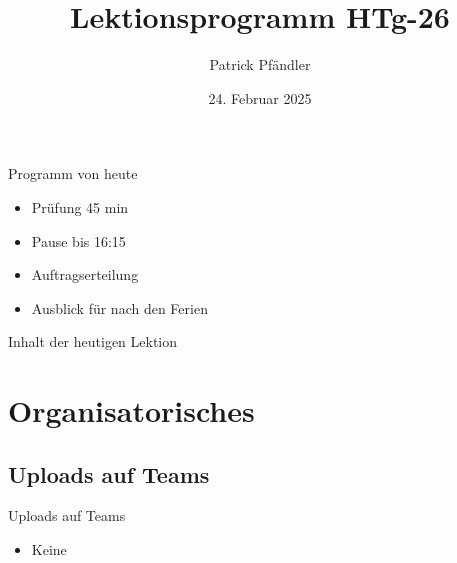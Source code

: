 



\title{\textbf{Lektionsprogramm HTg-26}}
\author{Patrick Pfändler}
\date{24. Februar   2025}




\frame{\titlepage}


\begin{frame}{Programm von heute}
    \begin{itemize}
        \item[\textbullet] Prüfung 45 min 
        \item[\textbullet] Pause bis 16:15
        \item[\textbullet] Auftragserteilung 
        \item[\textbullet] Ausblick für nach den Ferien
    \end{itemize}

\end{frame}



            

\folieFragen


\begin{frame}{Inhalt der heutigen Lektion}
    \tableofcontents
\end{frame}


\section{Organisatorisches}
\BlueSectionSlide

\subsection{Uploads auf Teams}
\begin{frame}{Uploads auf Teams}
    \begin{itemize}
        \item[\textbullet] Keine 
    \end{itemize}

\end{frame}




